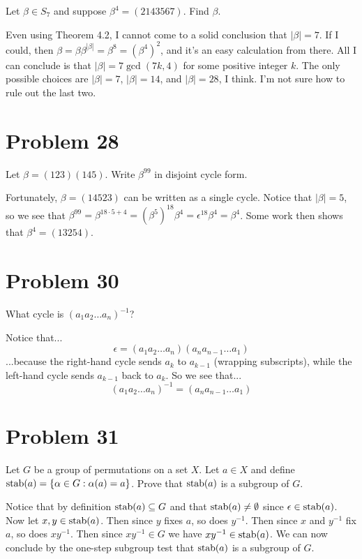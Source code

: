 \documentclass{article}
\begin{document}
Let $\beta\in S_7$ and suppose $\beta^4=(2143567)$.  Find $\beta$.

Even using Theorem 4.2, I cannot come to a solid conclusion that $|\beta|=7$.
If I could, then $\beta = \beta\beta^{|\beta|} = \beta^8 = (\beta^4)^2$,
and it's an easy calculation from there.  All I can conclude is that
$|\beta|=7\gcd(7k,4)$ for some positive integer $k$.  The only possible choices
are $|\beta|=7$, $|\beta|=14$, and $|\beta|=28$, I think.  I'm not sure how
to rule out the last two.

\section*{Problem 28}

Let $\beta=(123)(145)$.  Write $\beta^{99}$ in disjoint cycle form.

Fortunately, $\beta=(14523)$ can be written as a single cycle.
Notice that $|\beta|=5$, so we see that
$\beta^{99} = \beta^{18\cdot 5+4} = (\beta^5)^{18}\beta^4=\epsilon^{18}\beta^4=\beta^4$.
Some work then shows that $\beta^4=(13254)$.

\section*{Problem 30}

What cycle is $(a_1a_2\dots a_n)^{-1}$?

Notice that...
\begin{equation*}
\epsilon = (a_1a_2\dots a_n)(a_na_{n-1}\dots a_1)
\end{equation*}
...because the right-hand cycle sends $a_k$ to $a_{k-1}$ (wrapping subscripts), while
the left-hand cycle sends $a_{k-1}$ back to $a_k$.
So we see that...
\begin{equation*}
(a_1a_2\dots a_n)^{-1} = (a_na_{n-1}\dots a_1)
\end{equation*}

\section*{Problem 31}

Let $G$ be a group of permutations on a set $X$.  Let $a\in X$ and
define $\mbox{stab}(a)=\{\alpha\in G:\alpha(a)=a\}$.  Prove that $\mbox{stab}(a)$
is a subgroup of $G$.

Notice that by definition $\mbox{stab}(a)\subseteq G$ and that $\mbox{stab}(a)\neq\emptyset$
since $\epsilon\in\mbox{stab}(a)$.  Now let $x,y\in\mbox{stab}(a)$.  Then since $y$ fixes $a$,
so does $y^{-1}$.  Then since $x$ and $y^{-1}$ fix $a$, so does $xy^{-1}$.
Then since $xy^{-1}\in G$ we have $xy^{-1}\in\mbox{stab}(a)$.  We can now conclude by
the one-step subgroup test that $\mbox{stab}(a)$ is a subgroup of $G$.
\end{document}

